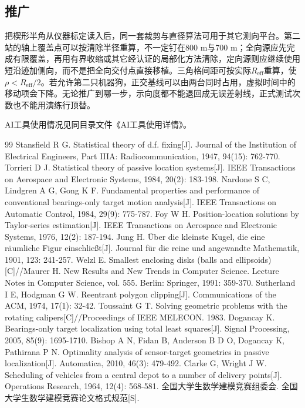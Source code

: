 \documentclass{cumcmthesis}
\begin{document}
\subsection{推广}

把楔形半角从仪器标定读入后，同一套裁剪与直径算法可用于其它测向平台。第二站的轴上覆盖点可以按清除半径重算，不一定钉在800 m与700 m；全向源应先完成有限覆盖，再用有界收缩或其它经认证的局部化方法清除，定向源则应继续使用短沿迹加侧向，而不是把全向交付点直接移植。三角格间距可按实际$R_{\mathrm{eff}}$重算，使$\rho<R_{\mathrm{eff}}/2$。若允许第二只机器狗，正交基线可以由两台同时占用，虚拟时间中的移动项会下降。无论推广到哪一步，示向度都不能退回成无误差射线，正式测试次数也不能用演练行顶替。

AI工具使用情况见同目录文件《AI工具使用详情》。

\begin{thebibliography}{99}
 Stansfield R G. Statistical theory of d.f. fixing[J]. Journal of the Institution of Electrical Engineers, Part IIIA: Radiocommunication, 1947, 94(15): 762-770.
 Torrieri D J. Statistical theory of passive location systems[J]. IEEE Transactions on Aerospace and Electronic Systems, 1984, 20(2): 183-198.
 Nardone S C, Lindgren A G, Gong K F. Fundamental properties and performance of conventional bearings-only target motion analysis[J]. IEEE Transactions on Automatic Control, 1984, 29(9): 775-787.
 Foy W H. Position-location solutions by Taylor-series estimation[J]. IEEE Transactions on Aerospace and Electronic Systems, 1976, 12(2): 187-194.
 Jung H. \"{U}ber die kleinste Kugel, die eine r\"{a}umliche Figur einschlie{\ss}t[J]. Journal f\"{u}r die reine und angewandte Mathematik, 1901, 123: 241-257.
 Welzl E. Smallest enclosing disks (balls and ellipsoids)[C]//Maurer H. New Results and New Trends in Computer Science. Lecture Notes in Computer Science, vol. 555. Berlin: Springer, 1991: 359-370.
 Sutherland I E, Hodgman G W. Reentrant polygon clipping[J]. Communications of the ACM, 1974, 17(1): 32-42.
 Toussaint G T. Solving geometric problems with the rotating calipers[C]//Proceedings of IEEE MELECON. 1983.
 Dogancay K. Bearings-only target localization using total least squares[J]. Signal Processing, 2005, 85(9): 1695-1710.
 Bishop A N, Fidan B, Anderson B D O, Dogancay K, Pathirana P N. Optimality analysis of sensor-target geometries in passive localization[J]. Automatica, 2010, 46(3): 479-492.
 Clarke G, Wright J W. Scheduling of vehicles from a central depot to a number of delivery points[J]. Operations Research, 1964, 12(4): 568-581.
 全国大学生数学建模竞赛组委会. 全国大学生数学建模竞赛论文格式规范[S].
\end{thebibliography}
\end{document}
